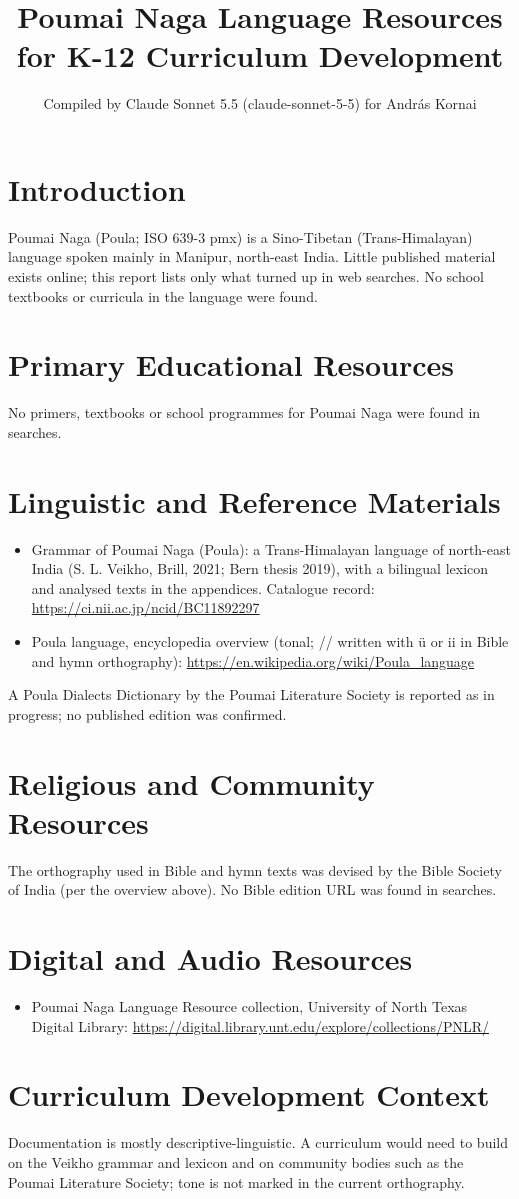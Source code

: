 \documentclass[12pt]{article}
\title{Poumai Naga Language Resources for K-12 Curriculum Development}
\author{Compiled by Claude Sonnet 5.5 (claude-sonnet-5-5) for Andr\'as Kornai}
\date{}
\begin{document}
\maketitle
\section{Introduction}
Poumai Naga (Poula; ISO 639-3 pmx) is a Sino-Tibetan (Trans-Himalayan) language spoken mainly in Manipur, north-east India. Little published material exists online; this report lists only what turned up in web searches. No school textbooks or curricula in the language were found.
\section{Primary Educational Resources}
No primers, textbooks or school programmes for Poumai Naga were found in searches.
\section{Linguistic and Reference Materials}
\begin{itemize}
\item Grammar of Poumai Naga (Poula): a Trans-Himalayan language of north-east India (S. L. Veikho, Brill, 2021; Bern thesis 2019), with a bilingual lexicon and analysed texts in the appendices. Catalogue record: \url{https://ci.nii.ac.jp/ncid/BC11892297}
\item Poula language, encyclopedia overview (tonal; /\textschwa/ written with \"u or ii in Bible and hymn orthography): \url{https://en.wikipedia.org/wiki/Poula_language}
\end{itemize}
A Poula Dialects Dictionary by the Poumai Literature Society is reported as in progress; no published edition was confirmed.
\section{Religious and Community Resources}
The orthography used in Bible and hymn texts was devised by the Bible Society of India (per the overview above). No Bible edition URL was found in searches.
\section{Digital and Audio Resources}
\begin{itemize}
\item Poumai Naga Language Resource collection, University of North Texas Digital Library: \url{https://digital.library.unt.edu/explore/collections/PNLR/}
\end{itemize}
\section{Curriculum Development Context}
Documentation is mostly descriptive-linguistic. A curriculum would need to build on the Veikho grammar and lexicon and on community bodies such as the Poumai Literature Society; tone is not marked in the current orthography.
\end{document}
